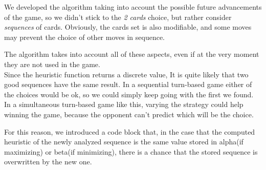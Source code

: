 We developed the algorithm taking into account the possible future advancements of the game, so we didn't stick to the \textit{2 cards} choice, but rather consider \textit{sequences} of cards.
Obviously, the cards set is also modifiable, and some moves may prevent the choice of other moves in sequence.

The algorithm takes into account all of these aspects, even if at the very moment they are not used in the game.\\

Since the heuristic function returns a discrete value, It is quite likely that two good sequences have the same result. In a sequential turn-based game either of the choices would be ok, so we could simply keep going with the first we found.
In a simultaneous turn-based game like this, varying the strategy could help winning the game, because the opponent can't predict which will be the choice.

For this reason, we introduced a code block that, in the case that the computed heuristic of the newly analyzed sequence is the same value stored in alpha(if maximizing) or beta(if minimizing), there is a chance that the stored sequence is overwritten by the new one.
\vspace{2cm}


